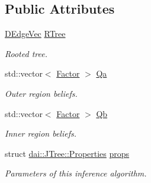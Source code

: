\subsection*{Public Attributes}
\begin{CompactItemize}
\item 
\hypertarget{classdai_1_1JTree_6ddedae95e2dda19e20b7b49455ea389}{
\hyperlink{namespacedai_e7764251ab4d4b2d4fbec214eac83079}{DEdgeVec} \hyperlink{classdai_1_1JTree_6ddedae95e2dda19e20b7b49455ea389}{RTree}}
\label{classdai_1_1JTree_6ddedae95e2dda19e20b7b49455ea389}

\begin{CompactList}\small\item\em Rooted tree. \item\end{CompactList}\item 
\hypertarget{classdai_1_1JTree_66cdd4d8258582aaf794466f3786dbfb}{
std::vector$<$ \hyperlink{classdai_1_1TFactor}{Factor} $>$ \hyperlink{classdai_1_1JTree_66cdd4d8258582aaf794466f3786dbfb}{Qa}}
\label{classdai_1_1JTree_66cdd4d8258582aaf794466f3786dbfb}

\begin{CompactList}\small\item\em Outer region beliefs. \item\end{CompactList}\item 
\hypertarget{classdai_1_1JTree_9d93e9f387d9772be5bc2b5372f7d20d}{
std::vector$<$ \hyperlink{classdai_1_1TFactor}{Factor} $>$ \hyperlink{classdai_1_1JTree_9d93e9f387d9772be5bc2b5372f7d20d}{Qb}}
\label{classdai_1_1JTree_9d93e9f387d9772be5bc2b5372f7d20d}

\begin{CompactList}\small\item\em Inner region beliefs. \item\end{CompactList}\item 
\hypertarget{classdai_1_1JTree_9bcd565eb07149a7aeeb0380e042036c}{
struct \hyperlink{structdai_1_1JTree_1_1Properties}{dai::JTree::Properties} \hyperlink{classdai_1_1JTree_9bcd565eb07149a7aeeb0380e042036c}{props}}
\label{classdai_1_1JTree_9bcd565eb07149a7aeeb0380e042036c}

\begin{CompactList}\small\item\em Parameters of this inference algorithm. \item\end{CompactList}\end{CompactItemize}

